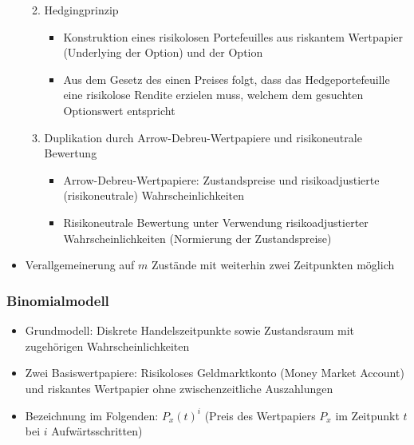 \begin{itemize}
\begin{enumerate}
\begin{itemize}
		\end{itemize}
		\item Hedgingprinzip
		\begin{itemize}
			\item Konstruktion eines risikolosen Portefeuilles aus riskantem Wertpapier (Underlying der Option) und der Option
			\item Aus dem Gesetz des einen Preises folgt, dass das Hedgeportefeuille eine risikolose Rendite erzielen muss, welchem dem gesuchten Optionswert entspricht
		\end{itemize}
		\item Duplikation durch Arrow-Debreu-Wertpapiere und risikoneutrale Bewertung
		\begin{itemize}
			\item Arrow-Debreu-Wertpapiere: Zustandspreise und risikoadjustierte (risikoneutrale) Wahrscheinlichkeiten
			\item Risikoneutrale Bewertung unter Verwendung risikoadjustierter Wahrscheinlichkeiten (Normierung der Zustandspreise)
		\end{itemize}
	\end{enumerate}
	\item Verallgemeinerung auf \(m\) Zustände mit weiterhin zwei Zeitpunkten möglich
\end{itemize}

\subsubsection{Binomialmodell}
\begin{itemize}
	\item Grundmodell: Diskrete Handelszeitpunkte sowie Zustandsraum mit zugehörigen Wahrscheinlichkeiten
	\item Zwei Basiswertpapiere: Risikoloses Geldmarktkonto (Money Market Account) und riskantes Wertpapier ohne zwischenzeitliche Auszahlungen
	\item Bezeichnung im Folgenden: \(P_x(t)^i\) (Preis des Wertpapiers \(P_x\) im Zeitpunkt \(t\) bei \(i\) Aufwärtsschritten)
\end{itemize}

